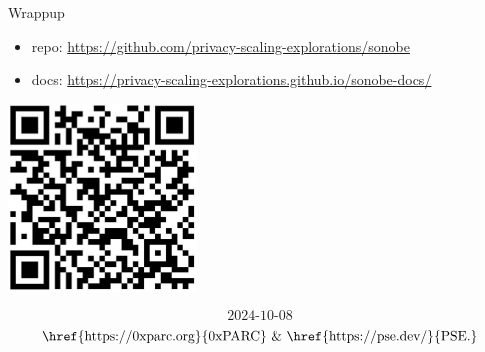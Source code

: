 \documentclass[t]{beamer} \usefonttheme[onlymath]{serif}
\begin{document}
\begin{frame}{Wrappup}
  \small{
  \begin{itemize}
    \item repo: \href{https://github.com/privacy-scaling-explorations/sonobe}{https://github.com/privacy-scaling-explorations/sonobe}
    \item docs: \href{https://privacy-scaling-explorations.github.io/sonobe-docs/}{https://privacy-scaling-explorations.github.io/sonobe-docs/}
  \end{itemize}
  }

  \begin{center}
    \includegraphics[width=5cm]{./imgs/sonobe-link-qrcode}
  \end{center}

\tiny{
  $$\text{2024-10-08}$$
  $$\text{\href{https://0xparc.org}{0xPARC}~\&~\href{https://pse.dev/}{PSE.}}$$
}
\end{frame}

% 
\end{document}
